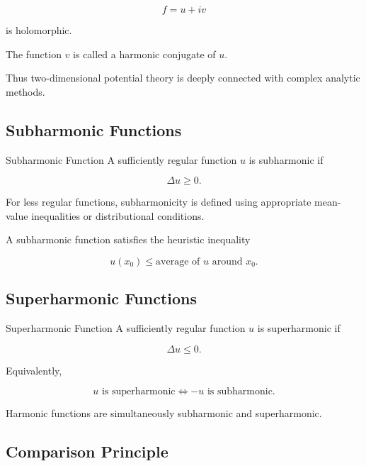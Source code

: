 \[
\boxed{
f=u+iv
}
\]

is holomorphic.

The function \(v\) is called a harmonic conjugate of \(u\).

Thus two-dimensional potential theory is deeply connected with complex
analytic methods.

\subsection{Subharmonic Functions}
\label{subsec:subharmonic-functions}

\begin{definitionbox}{Subharmonic Function}
A sufficiently regular function \(u\) is subharmonic if

\[
\boxed{
\Delta u\geq0.
}
\]
\end{definitionbox}

For less regular functions, subharmonicity is defined using appropriate
mean-value inequalities or distributional conditions.

A subharmonic function satisfies the heuristic inequality

\[
\boxed{
u(x_0)
\leq
\text{average of \(u\) around \(x_0\)}.
}
\]

\subsection{Superharmonic Functions}
\label{subsec:superharmonic-functions}

\begin{definitionbox}{Superharmonic Function}
A sufficiently regular function \(u\) is superharmonic if

\[
\boxed{
\Delta u\leq0.
}
\]
\end{definitionbox}

Equivalently,

\[
\boxed{
u\text{ is superharmonic}
\Longleftrightarrow
-u\text{ is subharmonic}.
}
\]

Harmonic functions are simultaneously subharmonic and superharmonic.

\subsection{Comparison Principle}
\label{subsec:potential-comparison-principle}

